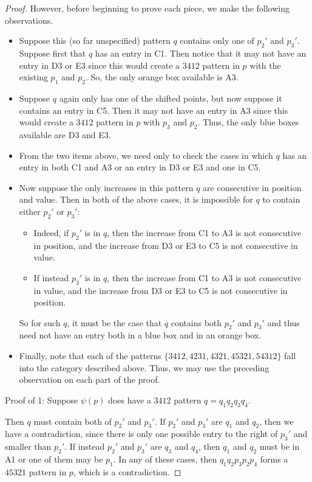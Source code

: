\documentclass[11pt]{amsart}
\theoremstyle{remark}
\numberwithin{equation}{section}
\begin{document}
\begin{proof}
    However, before beginning to prove each piece, we make the following observations.
    \begin{itemize}
        \item Suppose this (so far unspecified) pattern $q$ contains only one of $p_2'$ and $p_3'$. Suppose first that $q$ has an entry in C1. Then notice that it may not have an entry in D3 or E3 since this would create a $3412$ pattern in $p$ with the existing $p_1$ and $p_2$. So, the only orange box available is A3.
        \item Suppose $q$ again only has one of the shifted points, but now suppose it contains an entry in C5. Then it may not have an entry in A3 since this would create a $3412$ pattern in $p$ with $p_3$ and $p_2$. Thus, the only blue boxes available are D3 and E3. 
        \item From the two items above, we need only to check the cases in which $q$ has an entry in both C1 and A3 or an entry in D3 or E3 and one in C5.  
        \item Now suppose the only increases in this pattern $q$ are consecutive in position and value. Then in both of the above cases, it is impossible for $q$ to contain either $p_2'$ or $p_3'$: 
        \begin{itemize}
            \item Indeed, if $p_2'$ is in $q$, then the increase from C1 to A3 is not consecutive in position, and the increase from D3 or E3 to C5 is not consecutive in value.
            \item If instead $p_3'$ is in $q$, then the increase from C1 to A3 is not consecutive in value, and the increase from D3 or E3 to C5 is not consecutive in position.
        \end{itemize} 
        So for such $q$, it must be the case that $q$ contains both $p_2'$ and $p_3'$ and thus need not have an entry both in a blue box and in an orange box.
        \item Finally, note that each of the patterns $\{3412, 4231, 4321, 45321, 54312\}$ fall into the category described above. Thus, we may use the preceding observation on each part of the proof.
    \end{itemize}

    Proof of 1:
    Suppose $\psi(p)$ does have a $3412$ pattern $q= q_1q_2q_3q_4$. 
    


    Then $q$ must contain both of $p_2'$ and $p_3'$. If $p_2'$ and $p_3'$ are $q_1$ and $q_2$, then we have a contradiction, since there is only one possible entry to the right of $p_3'$ and smaller than $p_2'$. If instead $p_2'$ and $p_3'$ are $q_3$ and $q_4$, then $q_1$ and $q_2$ must be in A1 or one of them may be $p_1$. In any of these cases, then $q_1q_2p_3p_2p_4$ forms a $45321$ pattern in $p$, which is a contradiction.
    

\end{proof}
\end{document}
